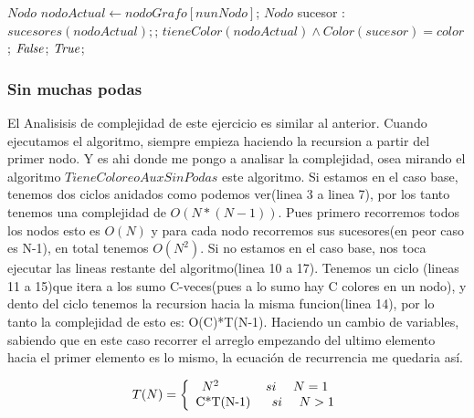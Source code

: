\begin{codebox}
	\li {}
	\li {}
	\li $Nodo$ $nodoActual \leftarrow nodoGrafo [ nunNodo ]$;
	\li	\For $Nodo$ sucesor $:$ \To $ sucesores(nodoActual); $;  \Do 
	\li		\If $ tieneColor(nodoActual) \land Color(sucesor) = color$; 	
	\li		\Then \Return $\id{False}$;
			\End
		\End	   
	\li \Return $\id{True}$;	
\end{codebox}

\subsubsection{Sin muchas podas} 

\vspace*{0.3cm}
El Analisisis de complejidad de este ejercicio es similar al anterior.
Cuando ejecutamos el algoritmo, siempre empieza haciendo la recursion a partir del primer nodo. Y es ahi donde me pongo a analisar la complejidad, osea mirando el algoritmo $TieneColoreoAuxSinPodas$ este algoritmo. \newline
Si estamos en el caso base, tenemos dos ciclos anidados como podemos ver(linea 3 a linea 7), por los tanto tenemos una complejidad de $O(N*(N-1))$. 
Pues  primero recorremos todos los nodos esto es $O(N)$ y para cada nodo recorremos sus sucesores(en peor caso es N-1), en total tenemos $O(N^2)$. \newline
Si no estamos en el caso base, nos toca ejecutar las lineas restante del algoritmo(linea 10 a 17).\newline
Tenemos un ciclo (lineas 11 a 15)que itera a los sumo C-veces(pues a lo sumo hay C colores en un nodo), y dento del ciclo tenemos la recursion hacia la misma funcion(linea 14), por lo tanto la complejidad de esto es: O(C)*T(N-1).\newline
Haciendo un cambio de variables, sabiendo que en este caso recorrer el arreglo empezando del  ultimo elemento hacia el primer elemento es lo mismo, la ecuación de recurrencia me quedaria así.

\begin{equation*}
T(N) = \left\lbrace
\begin{array}{c}
		N^2 \ \ \ \ \ \ \ \ \ \ \ si \ \ \ \   N = 1 \\
		$C*T(N-1)$  \  \ \ \  \ si \ \ \ \  N>1 \\
\end{array}
\right.
\end{equation*} 


